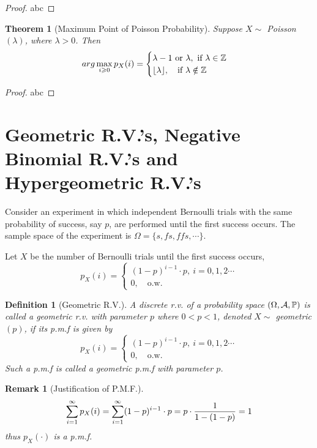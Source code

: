 \documentclass[openany,12pt]{book}
\newtheorem{theorem}{Theorem}[chapter]
\newtheorem{remark}{Remark}[chapter]
\newtheorem{definition}{Definition}[chapter]
\begin{document}
\begin{proof}
  abc
\end{proof}

\begin{theorem}[Maximum Point of Poisson Probability]
Suppose $X\sim$ Poisson$(\lambda)$, where $\lambda>0$. Then
$$
arg\max_{i\geqslant0}p_X(i)=
\begin{cases}
\lambda-1 \text{ or } \lambda,\ \text{if}\ \lambda\in\mathbb{Z}\\
\lfloor\lambda\rfloor,\quad \text{if}\ \lambda\notin\mathbb{Z}
\end{cases}
$$
\end{theorem}

\begin{proof}
  abc
\end{proof}

\section{Geometric R.V.'s, Negative Binomial R.V.'s and Hypergeometric R.V.'s}

Consider an experiment in which independent Bernoulli trials with the same probability of success, say $p$, are performed until the first success occurs. The sample space of the experiment is $\Omega=\{s,fs,ffs,\cdots\}$.

Let $X$ be the number of Bernoulli trials until the first success occurs,
$$
p_X (i)=
\begin{cases}
(1-p)^{i-1}\cdot p,\   i=0,1,2\cdots\\
0,\quad\text{o.w.}
\end{cases}
$$

\begin{definition}[Geometric R.V.]
A discrete r.v. of a probability space $(\Omega,\mathcal{A},\mathbb{P})$ is called a geometric r.v. with parameter $p$ where $0<p<1$, denoted $X\sim$ geometric$(p)$, if its p.m.f is given by
$$
p_X (i)=
\begin{cases}
(1-p)^{i-1}\cdot p,\   i=0,1,2\cdots\\
0,\quad\text{o.w.}
\end{cases}           
$$
Such a p.m.f is called a geometric p.m.f with parameter $p$.
\end{definition}

\begin{remark}[Justification of P.M.F.]
$$
\sum_{i=1}^{\infty} p_X (i)=\sum_{i=1}^{\infty}(1-p)^{i-1}\cdot p=p\cdot\frac{1}{1-(1-p)}=1 
$$
thus $p_X (\cdot)$ is a p.m.f. 
\end{remark}
\end{document}
